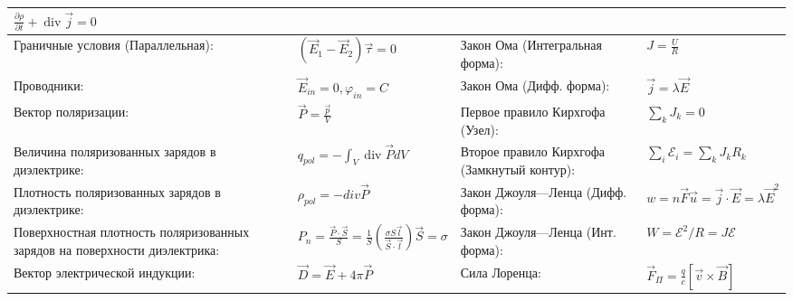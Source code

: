 \documentclass{article}
\begin{document}
\begin{tabular}{ |p{6cm}|p{3.5cm}|p{6cm}|p{3.5cm}|  }
$\frac{\partial \rho}{\partial t}+\operatorname{div} \vec{j}=0$            \\
\hline
Граничные условия (Параллельная):                                          &
$\left(\vec {E}_{1}-\vec{E}_{2}\right) \vec\tau=0$                         &
Закон Ома (Интегральная форма):                                            &
$J=\frac{U}{R}$                                                            \\
\hline
Проводники:                                                                &
$\vec E_{in} = 0, {\varphi}_{in} = C$                                      &
Закон Ома (Дифф. форма):                                                   &
$\vec{j}=\lambda \vec{E}$                                                  \\
\hline
Вектор поляризации:                                                        &
$\vec{P}=\frac{\vec{p}}{V}$                                                &
Первое правило Кирхгофа (Узел):                                            &
$\sum_{k} J_{k}=0$                                                         \\
\hline
Величина поляризованных зарядов в диэлектрике:                             &
$q_{pol}=-\int_{V} \operatorname{div} \vec{P} d V$                         &
Второе правило Кирхгофа (Замкнутый контур):                                &
$\sum_{i} \mathcal{E}_{i}=\sum_{k} J_{k} R_{k}$                            \\
\hline
Плотность поляризованных зарядов в диэлектрике:                            &
${\rho}_{pol}=-{div} \vec{P}$                                              &
Закон Джоуля—Ленца (Дифф. форма):                                          &
$w=n \vec{F} \vec{u}=\vec{j} \cdot \vec{E} = \lambda \vec{E}^{2}$          \\
\hline
Поверхностная плотность поляризованных зарядов на поверхности диэлектрика: &
$P_{n}=\frac{\vec{P} \cdot \vec{S}}{S} = \frac{1}{S}\left(\frac{\sigma S \vec{l}}{\vec{S} \cdot \vec{l}}\right) \vec{S}=\sigma$ &
Закон Джоуля—Ленца (Инт. форма):                                           &
$W=\mathcal{E}^{2} / R=J \mathcal{E}$                                      \\
\hline
Вектор электрической индукции:                                             &
$\vec{D}=\vec{E}+4 \pi \vec{P}$                                            &
Сила Лоренца:                                                              &
$\vec{F}_{\Pi}=\frac{q}{c} [\vec{v} \times \vec{B}]$                       \\

\end{tabular}
\end{document}
